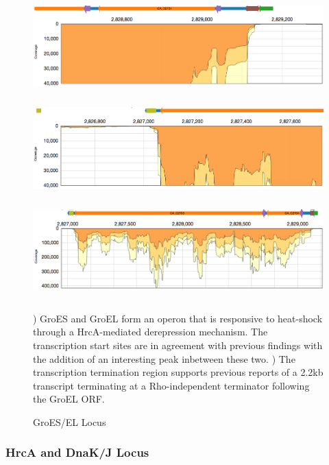 \begin{figure}
\small
{\includegraphics[width=\textwidth,height=1.5in]{images/Assembly/Examples/GroESL/GroESL-TSS.png}
\label{fig:7a}}
{\includegraphics[width=\textwidth,height=1.5in]{images/Assembly/Examples/GroESL/GroESL-termination.png}
\label{fig:7b}}
{\includegraphics[width=\textwidth,height=1.5in]{images/Assembly/Examples/GroESL/GroESL-curated.png}
\label{fig:7c}}
\caption{GroES/EL Locus}
) GroES and GroEL form an operon that is responsive to heat-shock through a HrcA-mediated derepression mechanism. The transcription start sites are in agreement with previous findings with the addition of an interesting peak inbetween these two. ) The transcription termination region supports previous reports of a 2.2kb transcript terminating at a Rho-independent terminator following the GroEL ORF. 
\end{figure}

\subsubsection{HrcA and DnaK/J Locus}
